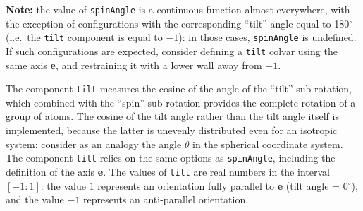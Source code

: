 \textbf{Note:} the value of \texttt{spinAngle} is a continuous function almost everywhere, with the exception of configurations with the corresponding ``tilt'' angle equal to 180$^\circ$ (i.e.~the \texttt{tilt} component is equal to $-1$): in those cases, \texttt{spinAngle} is undefined.  If such configurations are expected, consider defining a \texttt{tilt} colvar using the same axis \textbf{e}, and restraining it with a lower wall away from $-1$.



The component \texttt{tilt} measures the cosine of the angle of the ``tilt'' sub-rotation, which combined with the ``spin'' sub-rotation provides the complete rotation of a group of atoms.
The cosine of the tilt angle rather than the tilt angle itself is implemented, because the latter is unevenly distributed even for an isotropic system: consider as an analogy the angle $\theta$ in the spherical coordinate system.
The component \texttt{tilt} relies on the same options as \texttt{spinAngle}, including the definition of the axis \textbf{e}.
The values of \texttt{tilt} are real numbers in the interval $[-1:1]$: the value $1$ represents an orientation fully parallel to \textbf{e} (tilt angle = 0$^\circ$), and the value $-1$ represents an anti-parallel orientation.

\begin{cvcoptions}
\item %
\item %
\item %
\item %
\end{cvcoptions}



